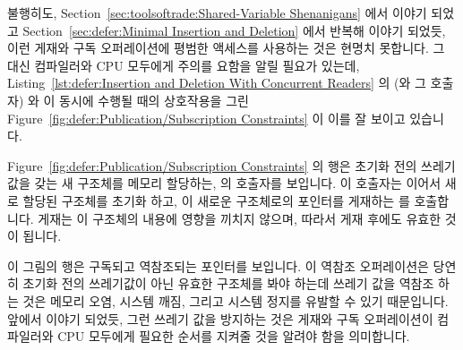 불행히도,
Section~\ref{sec:toolsoftrade:Shared-Variable Shenanigans}
에서 이야기 되었고
Section~\ref{sec:defer:Minimal Insertion and Deletion}
에서 반복해 이야기 되었듯, 이런 게재와 구독 오퍼레이션에 평범한 액세스를
사용하는 것은 현명치 못합니다.
그 대신 컴파일러와 CPU 모두에게 주의를 요함을 알릴 필요가 있는데,
Listing~\ref{lst:defer:Insertion and Deletion With Concurrent Readers} 의
 (와 그 호출자) 와  이 동시에 수행될 때의
상호작용을 그린
Figure~\ref{fig:defer:Publication/Subscription Constraints} 이 이를 잘 보이고
있습니다.

Figure~\ref{fig:defer:Publication/Subscription Constraints}
의  행은 초기화 전의 쓰레기 값을 갖는 새  구조체를
메모리 할당하는,  의 호출자를 보입니다.
이 호출자는 이어서 새로 할당된 구조체를 초기화 하고, 이 새로운 
구조체로의 포인터를 게재하는  를 호출합니다.
게재는 이 구조체의 내용에 영향을 끼치지 않으며, 따라서 게재 후에도 유효한 것이
됩니다.

이 그림의  행은 구독되고 역참조되는 포인터를 보입니다.
이 역참조 오퍼레이션은 당연히 초기화 전의 쓰레기값이 아닌 유효한 
구조체를 봐야 하는데 쓰레기 값을 역참조 하는 것은 메모리 오염, 시스템 깨짐,
그리고 시스템 정지를 유발할 수 있기 때문입니다.
앞에서 이야기 되었듯, 그런 쓰레기 값을 방지하는 것은 게재와 구독 오퍼레이션이
컴파일러와 CPU 모두에게 필요한 순서를 지켜줄 것을 알려야 함을 의미합니다.

